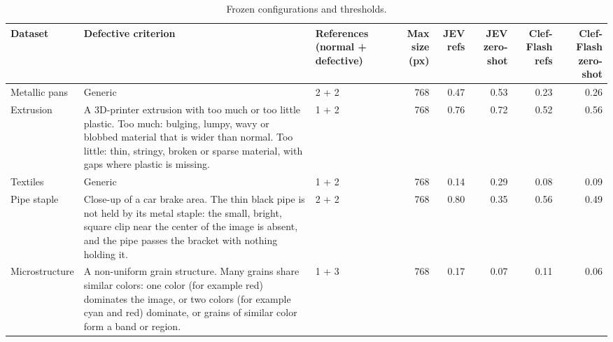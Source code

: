 \begin{table}

\caption{\label{tab:tbl-frozen}Frozen configurations and thresholds.}
\centering
\begin{tabular}[t]{l>{\raggedright\arraybackslash}p{6cm}lrrrrr}
\toprule
Dataset & Defective criterion & References (normal + defective) & Max size (px) & JEV refs & JEV zero-shot & Clef-Flash refs & Clef-Flash zero-shot\\
\midrule
Metallic pans & Generic & 2 + 2 & 768 & 0.47 & 0.53 & 0.23 & 0.26\\
Extrusion & A 3D-printer extrusion with too much or too little plastic. Too much: bulging, lumpy, wavy or blobbed material that is wider than normal. Too little: thin, stringy, broken or sparse material, with gaps where plastic is missing. & 1 + 2 & 768 & 0.76 & 0.72 & 0.52 & 0.56\\
Textiles & Generic & 1 + 2 & 768 & 0.14 & 0.29 & 0.08 & 0.09\\
Pipe staple & Close-up of a car brake area. The thin black pipe is not held by its metal staple: the small, bright, square clip near the center of the image is absent, and the pipe passes the bracket with nothing holding it. & 2 + 2 & 768 & 0.80 & 0.35 & 0.56 & 0.49\\
Microstructure & A non-uniform grain structure. Many grains share similar colors: one color (for example red) dominates the image, or two colors (for example cyan and red) dominate, or grains of similar color form a band or region. & 1 + 3 & 768 & 0.17 & 0.07 & 0.11 & 0.06\\
\bottomrule
\end{tabular}
\end{table}
